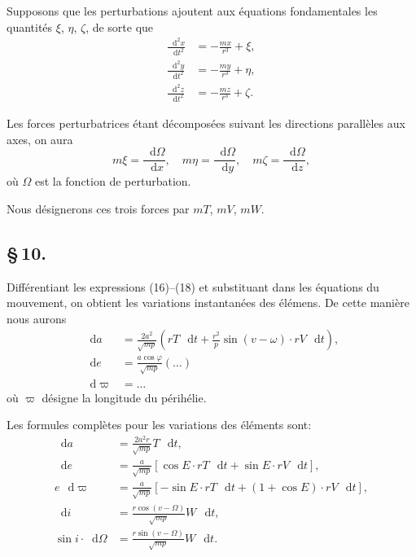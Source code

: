 \documentclass[12pt,a4paper]{article}
\newcommand{\dd}{\mathop{}\!\mathrm{d}}
\begin{document}
Supposons que les perturbations ajoutent aux \'{e}quations fondamentales les quantit\'{e}s $\xi$, $\eta$, $\zeta$, de sorte que
\begin{align}
\frac{\dd^2 x}{\dd t^2} &= -\frac{mx}{r^3} + \xi, \tag{43} \\
\frac{\dd^2 y}{\dd t^2} &= -\frac{my}{r^3} + \eta, \tag{44} \\
\frac{\dd^2 z}{\dd t^2} &= -\frac{mz}{r^3} + \zeta. \tag{45}
\end{align}

Les forces perturbatrices \'{e}tant d\'{e}compos\'{e}es suivant les directions parall\`{e}les aux axes, on aura
\begin{equation}
m\xi = \frac{\dd\Omega}{\dd x}, \quad m\eta = \frac{\dd\Omega}{\dd y}, \quad m\zeta = \frac{\dd\Omega}{\dd z}, \tag{46}
\end{equation}
o\`{u} $\Omega$ est la fonction de perturbation.

Nous d\'{e}signerons ces trois forces par $mT$, $mV$, $mW$.

\newpage
\subsection*{\S\,10.}

Diff\'{e}rentiant les expressions (16)--(18) et substituant dans les \'{e}quations du mouvement, on obtient les variations instantan\'{e}es des \'{e}l\'{e}mens. De cette mani\`{e}re nous aurons
\begin{align}
\dd a &= \frac{2a^2}{\sqrt{mp}}\left(rT\,\dd t + \frac{r^2}{p}\sin(v - \omega) \cdot rV\,\dd t\right), \tag{47} \\
\dd e &= \frac{a\cos\varphi}{\sqrt{mp}}\left(\ldots\right) \tag{48} \\
\dd\varpi &= \ldots \tag{49}
\end{align}
o\`{u} $\varpi$ d\'{e}signe la longitude du p\'{e}rih\'{e}lie.

Les formules compl\`{e}tes pour les variations des \'{e}l\'{e}ments sont:
\begin{align}
\dd a &= \frac{2a^2r}{\sqrt{mp}} T\,\dd t, \tag{50} \\
\dd e &= \frac{a}{\sqrt{mp}}\left[\cos E \cdot rT\,\dd t + \sin E \cdot rV\,\dd t\right], \tag{51} \\
e\,\dd\varpi &= \frac{a}{\sqrt{mp}}\left[-\sin E \cdot rT\,\dd t + (1 + \cos E)\cdot rV\,\dd t\right], \tag{52} \\
\dd i &= \frac{r\cos(v - \Omega)}{\sqrt{mp}} W\,\dd t, \tag{53} \\
\sin i \cdot \dd\Omega &= \frac{r\sin(v - \Omega)}{\sqrt{mp}} W\,\dd t. \tag{54}
\end{align}
\end{document}
